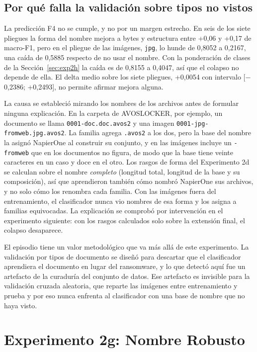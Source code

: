 \subsection{Por qué falla la validación sobre tipos no vistos}

La predicción F4 no se cumple, y no por un margen estrecho. En seis de los siete pliegues la forma del nombre mejora a bytes y estructura entre +0,06 y +0,17 de macro-F1, pero en el pliegue de las imágenes, \texttt{jpg}, lo hunde de 0,8052 a 0,2167, una caída de 0,5885 respecto de no usar el nombre. Con la ponderación de clases de la Sección~\ref{sec:exp2h} la caída es de 0,8155 a 0,4047, así que el colapso no depende de ella. El delta medio sobre los siete pliegues, +0,0054 con intervalo [$-$0,2386; +0,2493], no permite afirmar mejora alguna.

La causa se estableció mirando los nombres de los archivos antes de formular ninguna explicación. En la carpeta de AVOSLOCKER, por ejemplo, un documento se llama \texttt{0001-\allowbreak doc.doc.avos2} y una imagen \texttt{0001-\allowbreak jpg-\allowbreak fromweb.jpg.avos2}. La familia agrega \texttt{.avos2} a los dos, pero la base del nombre la asignó NapierOne al construir su conjunto, y en las imágenes incluye un \texttt{-fromweb} que en los documentos no figura, de modo que la base tiene veinte caracteres en un caso y doce en el otro. Los rasgos de forma del Experimento 2d se calculan sobre el nombre \textit{completo} (longitud total, longitud de la base y su composición), así que aprendieron también cómo nombró NapierOne sus archivos, y no solo cómo los renombra cada familia. Con las imágenes fuera del entrenamiento, el clasificador nunca vio nombres de esa forma y los asigna a familias equivocadas. La explicación se comprobó por intervención en el experimento siguiente: con los rasgos calculados solo sobre la extensión final, el colapso desaparece.

El episodio tiene un valor metodológico que va más allá de este experimento. La validación por tipos de documento se diseñó para descartar que el clasificador aprendiera el documento en lugar del ransomware, y lo que detectó aquí fue un artefacto de la curaduría del conjunto de datos. Ese artefacto es invisible para la validación cruzada aleatoria, que reparte las imágenes entre entrenamiento y prueba y por eso nunca enfrenta al clasificador con una base de nombre que no haya visto.

\section{Experimento 2g: Nombre Robusto}
\label{sec:exp2g}

